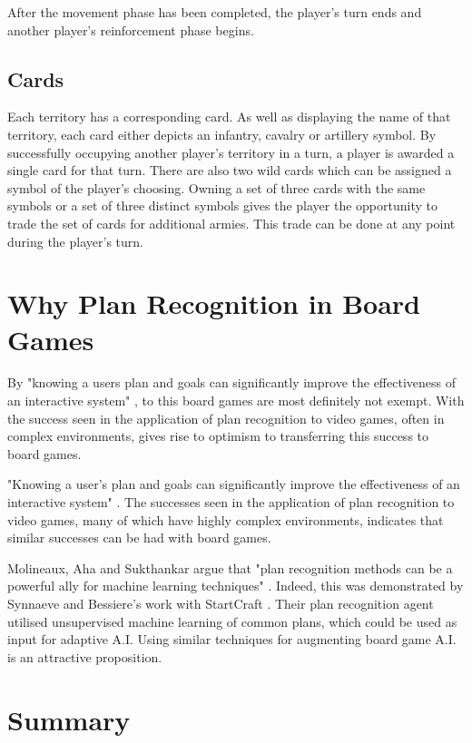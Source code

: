 \documentclass[parskip]{cs4rep}
\begin{document}
After the movement phase has been completed, the player’s turn ends and another player’s reinforcement phase begins.
\newpage

\subsection{Cards}

Each territory has a corresponding card. As well as displaying the name of that territory, each card either depicts an infantry, cavalry or artillery symbol. By successfully occupying another player's territory in a turn, a player is awarded a single card for that turn. There are also two wild cards which can be assigned a symbol of the player’s choosing. Owning a set of three cards with the same symbols or a set of three distinct symbols gives the player the opportunity to trade the set of cards for additional armies. This trade can be done at any point during the player’s turn. 

\section{Why Plan Recognition in Board Games}

By "knowing a users plan and goals can significantly improve the effectiveness of an interactive system" \cite{Carberry:2001:TPR:598284.598348}, to this board games are most definitely not exempt. With the success seen in the application of plan recognition to video games, often in complex environments, gives rise to optimism to transferring this success to board games.

"Knowing a user’s plan and goals can significantly improve the effectiveness of an interactive system" \cite{Carberry:2001:TPR:598284.598348}. The successes seen in the application of plan recognition to video games, many of which have highly complex environments, indicates that similar successes can be had with board games. 

Molineaux, Aha and Sukthankar argue that "plan recognition methods can be a powerful ally for machine learning techniques" \cite{Molineaux09g.:beating}. Indeed, this was demonstrated by  Synnaeve and Bessiere’s work with StartCraft \cite{conf/aiide/SynnaeveB11}. Their plan recognition agent utilised unsupervised machine learning of common plans, which could be used as input for adaptive A.I. Using similar techniques for augmenting board game A.I. is an attractive proposition. 

\section{Summary}
\end{document}
